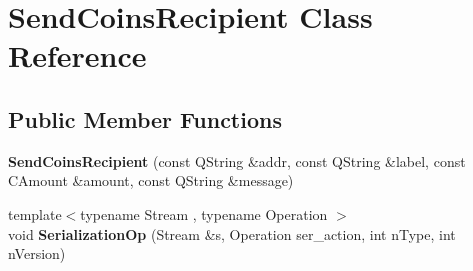 \hypertarget{class_send_coins_recipient}{}\section{Send\+Coins\+Recipient Class Reference}
\label{class_send_coins_recipient}
\subsection*{Public Member Functions}
\begin{DoxyCompactItemize}
\item 
\mbox{\label{class_send_coins_recipient_a2c70bbe5713b7e7c1ee3646d4b2d4408}} 
{\bfseries Send\+Coins\+Recipient} (const Q\+String \&addr, const Q\+String \&label, const C\+Amount \&amount, const Q\+String \&message)
\item 
\mbox{\label{class_send_coins_recipient_ac38f39acb9c37ccd824eb4587c94da85}} 
{\footnotesize template$<$typename Stream , typename Operation $>$ }\\void {\bfseries Serialization\+Op} (Stream \&s, Operation ser\+\_\+action, int n\+Type, int n\+Version)
\end{DoxyCompactItemize}
